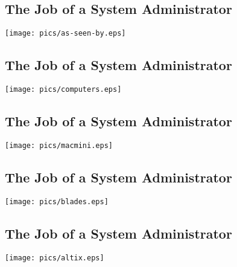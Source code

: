 \documentclass[xga]{xdvislides}
\begin{document}
\subsection{The Job of a System Administrator}
\vspace*{\fill}
\begin{center}
	\texttt{[image: pics/as-seen-by.eps]} \\
\end{center}
\vspace*{\fill}

\subsection{The Job of a System Administrator}
\begin{center}
	\texttt{[image: pics/computers.eps]} \\
\end{center}

\subsection{The Job of a System Administrator}
\vspace*{\fill}
\begin{center}
	\texttt{[image: pics/macmini.eps]} \\
\end{center}
\vspace*{\fill}

\subsection{The Job of a System Administrator}
\vspace*{\fill}
\begin{center}
	\texttt{[image: pics/blades.eps]} \\
\end{center}
\vspace*{\fill}

\subsection{The Job of a System Administrator}
\vspace*{\fill}
\begin{center}
	\texttt{[image: pics/altix.eps]} \\
\end{center}
\vspace*{\fill}
\end{document}
